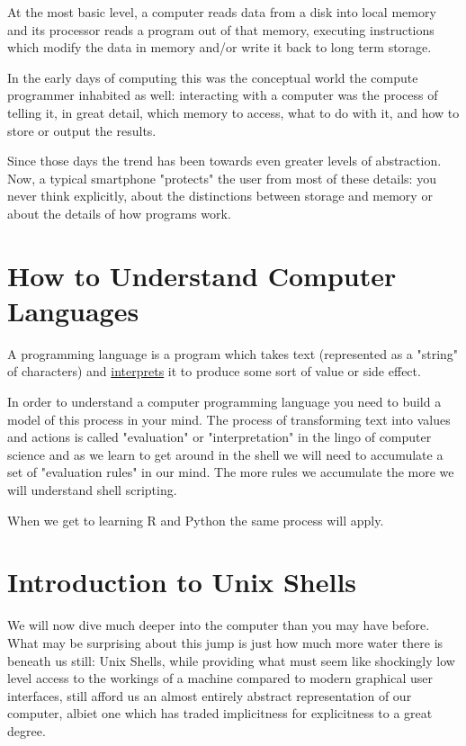 \documentclass[11pt]{article}
\begin{document}
At the most basic level, a computer reads data from a disk into local
memory and its processor reads a program out of that memory, executing
instructions which modify the data in memory and/or write it back to
long term storage.

In the early days of computing this was the conceptual world the
compute programmer inhabited as well: interacting with a computer was
the process of telling it, in great detail, which memory to access,
what to do with it, and how to store or output the results.

Since those days the trend has been towards even greater levels of
abstraction.  Now, a typical smartphone "protects" the user from most
of these details: you never think explicitly, about the distinctions
between storage and memory or about the details of how programs work.

\section{How to Understand Computer Languages}
\label{sec:org06ec6f0}

A programming language is a program which takes text (represented as a
"string" of characters) and \uline{interprets} it to produce some sort of
value or side effect.

In order to understand a computer programming language you need to
build a model of this process in your mind. The process of
transforming text into values and actions is called "evaluation" or
"interpretation" in the lingo of computer science and as we learn to
get around in the shell we will need to accumulate a set of
"evaluation rules" in our mind. The more rules we accumulate the more
we will understand shell scripting.

When we get to learning R and Python the same process will apply.

\section{Introduction to Unix Shells}
\label{sec:org355eab2}

We will now dive much deeper into the computer than you may have
before. What may be surprising about this jump is just how much more
water there is beneath us still: Unix Shells, while providing what
must seem like shockingly low level access to the workings of a
machine compared to modern graphical user interfaces, still afford us
an almost entirely abstract representation of our computer, albiet one
which has traded implicitness for explicitness to a great degree.
\end{document}
